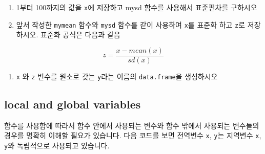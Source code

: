 \documentclass[
]{book}
\providecommand{\tightlist}{%
  \setlength{\itemsep}{0pt}\setlength{\parskip}{0pt}}
\begin{document}
\begin{enumerate}
\def\labelenumi{\arabic{enumi})}
\setcounter{enumi}{1}
\item
  1부터 100까지의 값을 \texttt{x}에 저장하고 mysd 함수를 사용해서 표준편차를 구하시오
\item
  앞서 작성한 \texttt{mymean} 함수와 \texttt{mysd} 함수를 같이 사용하여 \texttt{x}를 표준화 하고 \texttt{z}로 저장하시오. 표준화 공식은 다음과 같음
\end{enumerate}

\[ 
z = \frac{x - mean(x)}{sd(x)}
\]

\begin{enumerate}
\def\labelenumi{\arabic{enumi})}
\setcounter{enumi}{3}
\tightlist
\item
  \texttt{x} 와 \texttt{z} 변수를 원소로 갖는 \texttt{y}라는 이름의 \texttt{data.frame}을 생성하시오
\end{enumerate}

\hypertarget{local-and-global-variables}{%
\subsection{local and global variables}\label{local-and-global-variables}}

함수를 사용함에 따라서 함수 안에서 사용되는 변수와 함수 밖에서 사용되는 변수들의 경우를 명확히 이해할 필요가 있습니다. 다음 코드를 보면 전역변수 \texttt{x}, \texttt{y}는 지역변수 \texttt{x}, \texttt{y}와 독립적으로 사용되고 있습니다.
\end{document}
